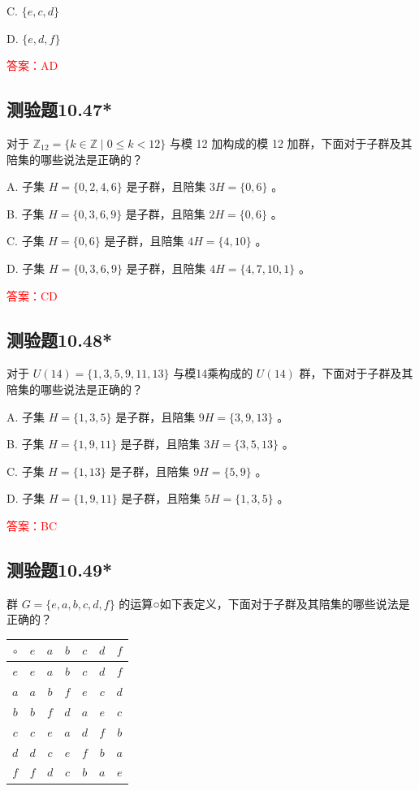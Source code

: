 \documentclass[UTF8, heading=true]{ctexart}
\begin{document}
C. $\{e, c, d\}$

D. $\{e, d, f\}$

\textcolor{red}{答案：AD}

\subsection{测验题10.47*}

对于 $\mathbb{Z}_{12}=\{k \in \mathbb{Z} \mid 0 \leq k<12\}$ 与模 12 加构成的模 12 加群，下面对于子群及其陪集的哪些说法是正确的？

A. 子集 ${H}=\{0,2,4,6\}$ 是子群，且陪集 $3 {H}=\{0,6\}$ 。

B. 子集 ${H}=\{0,3,6,9\}$ 是子群，且陪集 $2 {H}=\{0,6\}$ 。

C. 子集 $H=\{0,6\}$ 是子群，且陪集 $4 {H}=\{4,10\}$ 。

D. 子集 ${H}=\{0,3,6,9\}$ 是子群，且陪集 $4 {H}=\{4,7,10,1\}$ 。

\textcolor{red}{答案：CD}

\subsection{测验题10.48*}

对于 ${U}(14)=\{1,3,5,9,11,13\}$ 与模14乘构成的 $U(14)$ 群，下面对于子群及其陪集的哪些说法是正确的？

A. 子集 ${H}=\{1,3,5\}$ 是子群，且陪集 $9 {H}=\{3,9,13\}$ 。

B. 子集 $H=\{1,9,11\}$ 是子群，且陪集 $3 H=\{3,5,13\}$ 。

C. 子集 ${H}=\{1,13\}$ 是子群，且陪集 $9 {H}=\{5,9\}$ 。

D. 子集 ${H}=\{1,9,11\}$ 是子群，且陪集 $5 {H}=\{1,3,5\}$ 。

\textcolor{red}{答案：BC}

\subsection{测验题10.49*}

群 $G=\{e, a, b, c, d, f\}$ 的运算○如下表定义，下面对于子群及其陪集的哪些说法是正确的？

\begin{table}[H]
  \renewcommand{\arraystretch}{1.5}
  \centering
\begin{tabular}{c|cccccc}
\hline$\circ$ & $e$ & $a$ & $b$ & $c$ & $d$ & $f$ \\
\hline$e$ & $e$ & $a$ & $b$ & $c$ & $d$ & $f$ \\
$a$ & $a$ & $b$ & $f$ & $e$ & $c$ & $d$ \\
$b$ & $b$ & $f$ & $d$ & $a$ & $e$ & $c$ \\
$c$ & $c$ & $e$ & $a$ & $d$ & $f$ & $b$ \\
$d$ & $d$ & $c$ & $e$ & $f$ & $b$ & $a$ \\
$f$ & $f$ & $d$ & $c$ & $b$ & $a$ & $e$ \\
\hline
\end{tabular}
\end{table}
\end{document}
